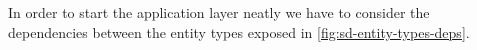 In order to start the application layer neatly we have to consider the 
dependencies between the entity types exposed in \ref{fig:sd-entity-types-deps}. 


